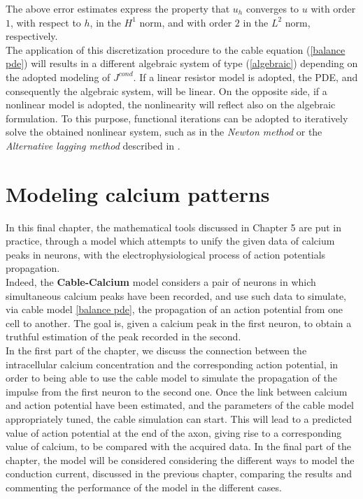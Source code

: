 \documentclass[12pt, a4paper]{report}
\begin{document}
The above error estimates express the property that $u_h$ converges to $u$ with order $1$, with respect to $h$, in the $H^1$ norm, and with order $2$ in the $L^2$ norm, respectively.\\
The application of this discretization procedure to the cable equation (\ref{balance pde}) will results in a different algebraic system of type (\ref{algebraic}) depending on the adopted modeling of  $J^{cond}$. If a linear resistor model is adopted, the PDE, and consequently the algebraic system, will be linear. On the opposite side, if a nonlinear model is adopted, the nonlinearity will reflect also on the algebraic formulation. To this purpose, functional iterations can be adopted to iteratively solve the obtained nonlinear system, such as in the \textit{Newton method} or the \textit{Alternative lagging method} described in \cite{35}.

\newpage

\chapter{Modeling calcium patterns}

In this final chapter, the mathematical tools discussed in Chapter 5 are put in practice, through a model which attempts to unify the given data of calcium peaks in neurons, with the electrophysiological process of action potentials propagation.\\
Indeed, the \textbf{Cable-Calcium} model considers a pair of neurons in which simultaneous calcium peaks have been recorded, and use such data to simulate, via cable model \ref{balance pde}, the propagation of an action potential from one cell to another. The goal is, given a calcium peak in the first neuron, to obtain a truthful estimation of the peak recorded in the second.\\ 
In the first part of the chapter, we discuss the connection between the intracellular calcium concentration and the corresponding action potential, in order to being able to use the cable model to simulate the propagation of the impulse from the first neuron to the second one. Once the link between calcium and action potential have been estimated, and the parameters of the cable model appropriately tuned, the cable simulation can start. This will lead to a predicted value of action potential at the end of the axon, giving rise to a corresponding value of calcium, to be compared with the acquired data. In the final part of the chapter, the model will be considered considering the different ways to model the conduction current, discussed in the previous chapter, comparing the results and commenting the performance of the model in the different cases.
\end{document}
